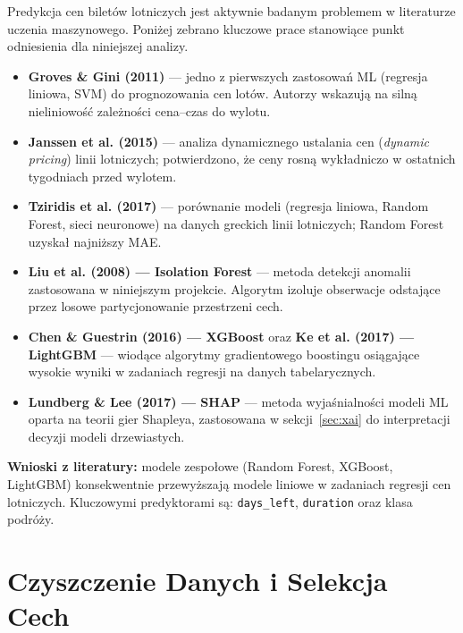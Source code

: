 \documentclass[12pt,a4paper]{article}
\begin{document}
	Predykcja cen biletów lotniczych jest aktywnie badanym problemem w literaturze
	uczenia maszynowego. Poniżej zebrano kluczowe prace stanowiące punkt odniesienia
	dla niniejszej analizy.
	
	\begin{itemize}
		\item \textbf{Groves \& Gini (2011)} --- jedno z pierwszych zastosowań ML
		(regresja liniowa, SVM) do prognozowania cen lotów. Autorzy wskazują na silną
		nieliniowość zależności cena--czas do wylotu.
		
		\item \textbf{Janssen et al. (2015)} --- analiza dynamicznego ustalania cen
		(\textit{dynamic pricing}) linii lotniczych; potwierdzono, że ceny rosną
		wykładniczo w ostatnich tygodniach przed wylotem.
		
		\item \textbf{Tziridis et al. (2017)} --- porównanie modeli (regresja liniowa,
		Random Forest, sieci neuronowe) na danych greckich linii lotniczych; Random
		Forest uzyskał najniższy MAE.
		
		\item \textbf{Liu et al. (2008) --- Isolation Forest} --- metoda detekcji
		anomalii zastosowana w niniejszym projekcie. Algorytm izoluje obserwacje
		odstające przez losowe partycjonowanie przestrzeni cech.
		
		\item \textbf{Chen \& Guestrin (2016) --- XGBoost} oraz
		\textbf{Ke et al. (2017) --- LightGBM} --- wiodące algorytmy gradientowego
		boostingu osiągające wysokie wyniki w zadaniach regresji na danych tabelarycznych.
		
		\item \textbf{Lundberg \& Lee (2017) --- SHAP} --- metoda wyjaśnialności modeli
		ML oparta na teorii gier Shapleya, zastosowana w sekcji~\ref{sec:xai} do
		interpretacji decyzji modeli drzewiastych.
	\end{itemize}
	
	\noindent\textbf{Wnioski z literatury:} modele zespołowe (Random Forest, XGBoost,
	LightGBM) konsekwentnie przewyższają modele liniowe w zadaniach regresji cen
	lotniczych. Kluczowymi predyktorami są: \texttt{days\_left}, \texttt{duration}
	oraz klasa podróży.
	
	\section{Czyszczenie Danych i Selekcja Cech}
	
\end{document}
